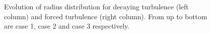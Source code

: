 \begin{figure}[H]\ContinuedFloat\centering
{}
\end{figure}

\begin{figure}[H]\ContinuedFloat\centering
{}
\caption{Evolution of radius distribution for decaying turbulence (left column)
and forced turbulence (right column). From up to bottom are case 1, case 2 and
case 3 respectively.}\label{fig:rad_distri} \end{figure}

